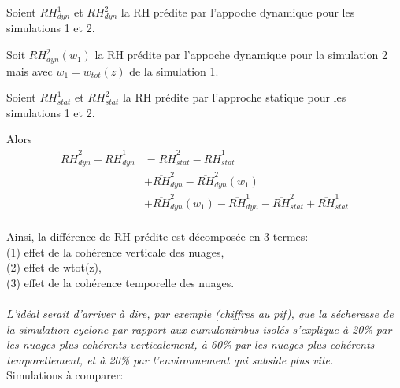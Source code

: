 \documentclass{article}
\begin{document}
\begin{list}{}{}
    \item Soient $RH_{dyn}^1$ et $RH_{dyn}^2$ la RH prédite par l'appoche dynamique pour les simulations 1 et 2. 
    \item Soit $RH_{dyn}^2(w_1)$ la RH prédite par l'appoche dynamique pour la simulation 2 mais avec $w_1 = w_{tot}(z)$ de la simulation 1. 
    \item Soient $RH_{stat}^1$ et $RH_{stat}^2$ la RH prédite par l'approche statique pour les simulations 1 et 2. 
\end{list}

Alors
~\\
\begin{align}
    \overline{RH}_{dyn}^2-\overline{RH}_{dyn}^1 &= \overline{RH}_{stat}^2-\overline{RH}_{stat}^1 \\
   &+ \overline{RH}_{dyn}^2-\overline{RH}_{dyn}^2(w_1) \\ 
   &+ \overline{RH}_{dyn}^2(w_1)-\overline{RH}_{dyn}^1-\overline{RH}_{stat}^2+\overline{RH}_{stat}^1 
\end{align}
~\\
Ainsi, la différence de RH prédite est décomposée en 3 termes:\\ 
(1) effet de la cohérence verticale des nuages, \\
(2) effet de wtot(z), \\ 
(3) effet de la cohérence temporelle des nuages.\\ ~\\
\textit{L'idéal serait d'arriver à dire, par exemple (chiffres au pif), que la sécheresse de la simulation cyclone par rapport aux cumulonimbus isolés s'explique à 20\% par les nuages plus cohérents verticalement, à 60\% par les nuages plus cohérents temporellement, et à 20\% par l'environnement qui subside plus vite.} \\

Simulations à comparer:
\end{document}
